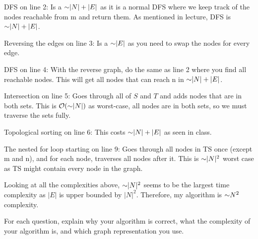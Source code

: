 \begin{problem}
\begin{questions}
DFS on line 2: Is a $\mathord{\sim}|N|+|E|$ as it is a normal DFS where we keep track of the nodes reachable from m and return them. As mentioned in lecture, DFS is $\mathord{\sim}|N|+|E|$.

Reversing the edges on line 3: Is a $\mathord{\sim}|E|$ as you need to swap the nodes for every edge.

DFS on line 4: With the reverse graph, do the same as line 2 where you find all reachable nodes. This will get all nodes that can reach n in $\mathord{\sim}|N|+|E|$.

Intersection on line 5: Goes through all of $S$ and $T$ and adds nodes that are in both sets. This is $\mathcal{O}(\mathord{\sim}|N|)$ as worst-case, all nodes are in both sets, so we must traverse the sets fully.

Topological sorting on line 6: This costs $\mathord{\sim}|N| + |E|$ as seen in class.

The nested for loop starting on line 9: Goes through all nodes in TS once (except m and n), and for each node, traverses all nodes after it. This is $\mathord{\sim}|N|^2$ worst case as TS might contain every node in the graph.

Looking at all the complexities above, $\mathord{\sim}|N|^2$ seems to be the largest time complexity as $|E|$ is upper bounded by $|N|^2$. Therefore, my algorithm is $\mathord{\sim}N^2$ complexity.




\end{questions}
For each question, explain why your algorithm is correct, what the complexity of your algorithm is, and which graph representation you use.
\end{problem}

